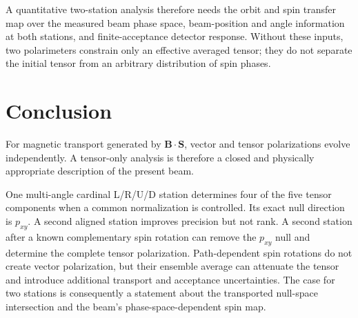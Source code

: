 \documentclass[11pt,a4paper]{article}
\newcommand{\vect}[1]{\bm{#1}}
\begin{document}
A quantitative two-station analysis therefore needs the orbit and spin transfer
map over the measured beam phase space, beam-position and angle information at
both stations, and finite-acceptance detector response.  Without these inputs,
two polarimeters constrain only an effective averaged tensor; they do not
separate the initial tensor from an arbitrary distribution of spin phases.

\section{Conclusion}

For magnetic transport generated by $\vect B\cdot\vect S$, vector and tensor
polarizations evolve independently.  A tensor-only analysis is therefore a
closed and physically appropriate description of the present beam.

One multi-angle cardinal L/R/U/D station determines four of the five tensor
components when a common normalization is controlled.  Its exact null direction
is $p_{xy}$.  A second aligned station improves precision but not rank.  A second
station after a known complementary spin rotation can remove the $p_{xy}$ null
and determine the complete tensor polarization.  Path-dependent spin rotations
do not create vector polarization, but their ensemble average can attenuate the
tensor and introduce additional transport and acceptance uncertainties.  The
case for two stations is consequently a statement about the transported
null-space intersection and the beam's phase-space-dependent spin map.
\end{document}
